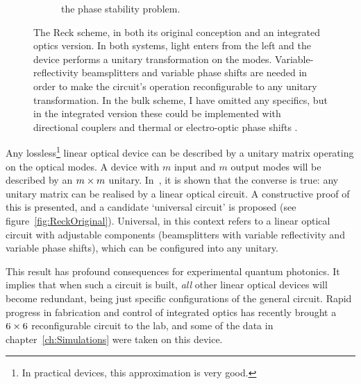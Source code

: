 \begin{figure}[p]
\begin{subfigure}{\textwidth}
{    the phase stability problem.}
    \label{fig:ReckGeneral}
  \end{subfigure}
  \caption[The Reck scheme, in both its original conception and an integrated
  optics version]{The Reck scheme, in both its original conception and an
  integrated
  optics version. In both systems, light enters from the left and the device
  performs a unitary transformation on the modes. Variable-reflectivity
  beamsplitters and variable phase shifts are needed in order to make the
  circuit's operation reconfigurable to any unitary transformation. In the
  bulk scheme, I have omitted any specifics, but in the integrated version these
  could be implemented with directional couplers and thermal or electro-optic
  phase shifts .}
  \label{fig:ReckScheme}
\end{figure}
Any lossless\footnote{In practical devices, this approximation is very good.
} linear optical device can be
described by a unitary matrix operating on the optical modes. A device with
\(m\) input and \(m\) output modes will be described by an \(m \times m\) unitary.
In~\cite{reck}, it is shown that the converse is true: any unitary matrix can
be realised by a linear optical circuit. A constructive proof of this is
presented, and a candidate `universal circuit' is proposed (see
figure~\ref{fig:ReckOriginal}). Universal, in this context refers to a linear
optical circuit with adjustable components (beamsplitters with variable
reflectivity and variable phase shifts), which can be configured into any
unitary.

This result has profound consequences for experimental quantum photonics.
It implies that when such a circuit is built, \emph{all} other linear optical
devices will become redundant, being just specific configurations of the
general circuit. Rapid progress in fabrication and control of integrated optics
has recently brought a \(6 \times 6\) reconfigurable circuit to the lab, and some
of the data in chapter~\ref{ch:Simulations} were taken on this device.

